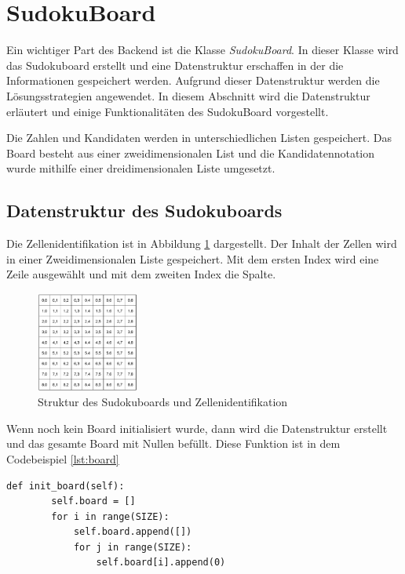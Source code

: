 \section{SudokuBoard}

Ein wichtiger Part des Backend ist die Klasse \textit{SudokuBoard}. In dieser Klasse wird das Sudokuboard erstellt und eine Datenstruktur erschaffen in der die Informationen gespeichert werden. Aufgrund dieser Datenstruktur werden die Lösungsstrategien angewendet. In diesem Abschnitt wird die Datenstruktur erläutert und einige Funktionalitäten des SudokuBoard vorgestellt.

Die Zahlen und Kandidaten werden in unterschiedlichen Listen gespeichert. Das Board besteht aus einer zweidimensionalen List und die Kandidatennotation wurde mithilfe einer dreidimensionalen Liste umgesetzt. 

\subsection{Datenstruktur des Sudokuboards}
Die Zellenidentifikation ist in Abbildung \ref{fig:Sudokugitter} dargestellt. Der Inhalt der Zellen wird in einer Zweidimensionalen Liste gespeichert. Mit dem ersten Index wird eine Zeile ausgewählt und mit dem zweiten Index die Spalte. 

\begin{figure}[htbp]
	\centering
	\includegraphics[width=0.3\textwidth]{images/board.png}
	\caption{Struktur des Sudokuboards und Zellenidentifikation \cite{zambon2015sudoku}}
	\label{fig:Sudokugitter}
\end{figure}

Wenn noch kein Board initialisiert wurde, dann wird die Datenstruktur erstellt und das gesamte Board mit Nullen befüllt. Diese Funktion ist in dem Codebeispiel \ref{lst:board} 

\begin{lstlisting}[caption={Initalisierung des Boards}, label={lst:board}]
	def init_board(self):
		self.board = []
		for i in range(SIZE):
			self.board.append([])
			for j in range(SIZE):
				self.board[i].append(0)
\end{lstlisting}

